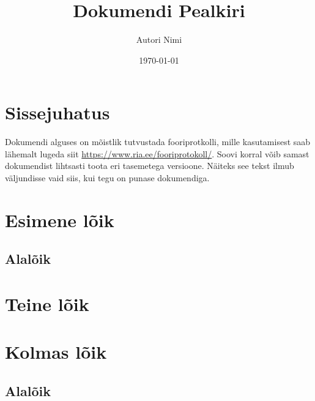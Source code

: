\documentclass[10pt,a4paper, twoside]{article}
\title{Dokumendi Pealkiri}
\author{Autori Nimi}
\date{\today}
\begin{document}
\clearpage\maketitle
\thispagestyle{empty}
\pagebreak

\tableofcontents
\section{Sissejuhatus}
Dokumendi alguses on mõistlik tutvustada fooriprotkolli, mille kasutamisest saab lähemalt lugeda siit \url{https://www.ria.ee/fooriprotokoll/}. Soovi korral võib samast dokumendist lihtsasti toota eri tasemetega versioone. \ifpunane Näiteks see tekst ilmub väljundisse vaid siis, kui tegu on punase dokumendiga.\fi
\fooriprotokoll

\section{Esimene lõik}
\subsection{Alalõik}
\lipsum[1-6]

\section{Teine lõik}
\lipsum[1]

\section{Kolmas lõik}
\subsection{Alalõik}
\lipsum[1]
\end{document}
